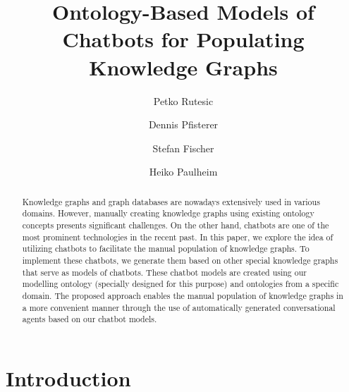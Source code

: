 \documentclass[runningheads]{llncs}
\begin{document}
%
\title{Ontology-Based Models of Chatbots for Populating Knowledge Graphs}
%
%
\author{Petko Rutesic \and
Dennis Pfisterer \and
Stefan Fischer\and
Heiko Paulheim
}


%
%
%
\maketitle              %
%
\begin{abstract}
Knowledge graphs and graph databases are nowadays extensively used in various domains. However, manually creating knowledge graphs using existing ontology concepts presents significant challenges.  On the other hand, chatbots are one of the most prominent technologies in the recent past. In this paper, we explore the idea of utilizing chatbots to facilitate the manual population of knowledge graphs. To implement these chatbots, we generate them based on other special knowledge graphs that serve as models of chatbots. These chatbot models are created using our modelling ontology (specially designed for this purpose) and  ontologies from a specific domain.  The proposed approach enables the manual population of knowledge graphs in a more convenient manner through the use of automatically generated conversational agents based on our chatbot models.

\end{abstract}
%
%
%
\section{Introduction}
\end{document}
